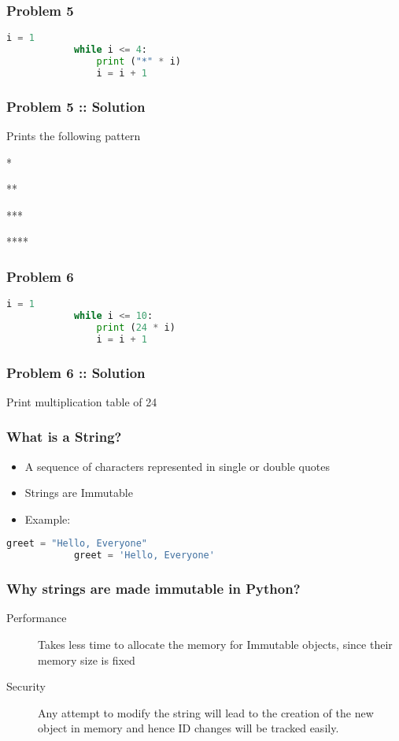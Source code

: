\documentclass[14pt]{beamer}
\begin{document}
    \begin{frame}[containsverbatim]
        \frametitle{Problem 5}
        \begin{lstlisting}[language=Python]
            i = 1
            while i <= 4:
                print ("*" * i)
                i = i + 1
        \end{lstlisting}
    \end{frame}
    \begin{frame}
        \frametitle{Problem 5 :: Solution}
        Prints the following pattern

        * 

        **

        ***

        ****
    \end{frame}
    \begin{frame}[containsverbatim]
        \frametitle{Problem 6}
        \begin{lstlisting}[language=Python]
            i = 1
            while i <= 10:
                print (24 * i)
                i = i + 1
        \end{lstlisting}
    \end{frame}
    \begin{frame}
        \frametitle{Problem 6 :: Solution}
        Print multiplication table of 24
    \end{frame}
    \begin{frame}[containsverbatim]
        \frametitle{What is a String?}
        \begin{itemize}
            \item A sequence of characters represented in single or double quotes
            \item Strings are Immutable
            \item \alert{Example:}  
        \end{itemize}
	    \begin{lstlisting}[language=Python]
            greet = "Hello, Everyone" 
            greet = 'Hello, Everyone'
        \end{lstlisting}
    \end{frame}
    \begin{frame}
        \frametitle{Why strings are made immutable in Python?}
        \begin{description}
            \item [Performance] Takes less time to allocate the memory for Immutable objects, since their memory size is fixed
            \item [Security] Any attempt to modify the string will lead to the creation of the new object in memory and hence ID changes will be tracked easily.
        \end{description}
    \end{frame}
\end{document}
